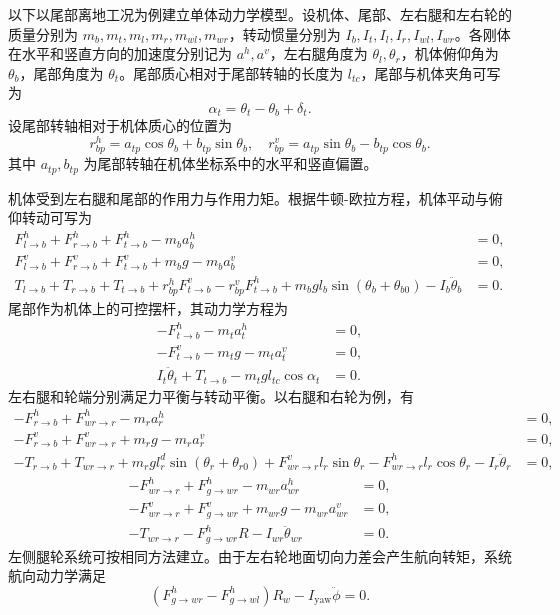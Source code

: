 \documentclass[type=bachelor]{bithesis}
\begin{document}
以下以尾部离地工况为例建立单体动力学模型。设机体、尾部、左右腿和左右轮的质量分别为 $m_b,m_t,m_l,m_r,m_{wl},m_{wr}$，转动惯量分别为 $I_b,I_t,I_l,I_r,I_{wl},I_{wr}$。各刚体在水平和竖直方向的加速度分别记为 $a^h,a^v$，左右腿角度为 $\theta_l,\theta_r$，机体俯仰角为 $\theta_b$，尾部角度为 $\theta_t$。尾部质心相对于尾部转轴的长度为 $l_{tc}$，尾部与机体夹角可写为
\begin{equation}
  \alpha_t=\theta_t-\theta_b+\delta_t .
\end{equation}
设尾部转轴相对于机体质心的位置为
\begin{equation}
  r_{bp}^h=a_{tp}\cos\theta_b+b_{tp}\sin\theta_b,\quad
  r_{bp}^v=a_{tp}\sin\theta_b-b_{tp}\cos\theta_b .
\end{equation}
其中 $a_{tp},b_{tp}$ 为尾部转轴在机体坐标系中的水平和竖直偏置。

机体受到左右腿和尾部的作用力与作用力矩。根据牛顿-欧拉方程，机体平动与俯仰转动可写为
\begin{equation}
\begin{aligned}
  F_{l\to b}^h+F_{r\to b}^h+F_{t\to b}^h-m_ba_b^h&=0,\\
  F_{l\to b}^v+F_{r\to b}^v+F_{t\to b}^v+m_bg-m_ba_b^v&=0,\\
  T_{l\to b}+T_{r\to b}+T_{t\to b}
  +r_{bp}^hF_{t\to b}^v-r_{bp}^vF_{t\to b}^h
  +m_bgl_b\sin(\theta_b+\theta_{b0})
  -I_b\ddot{\theta}_b&=0 .
\end{aligned}
\end{equation}
尾部作为机体上的可控摆杆，其动力学方程为
\begin{equation}
\begin{aligned}
  -F_{t\to b}^h-m_ta_t^h&=0,\\
  -F_{t\to b}^v-m_tg-m_ta_t^v&=0,\\
  I_t\ddot{\theta}_t+T_{t\to b}-m_tgl_{tc}\cos\alpha_t&=0 .
\end{aligned}
\end{equation}
左右腿和轮端分别满足力平衡与转动平衡。以右腿和右轮为例，有
\begin{equation}
\begin{aligned}
  -F_{r\to b}^h+F_{wr\to r}^h-m_ra_r^h&=0,\\
  -F_{r\to b}^v+F_{wr\to r}^v+m_rg-m_ra_r^v&=0,\\
  -T_{r\to b}+T_{wr\to r}
  +m_rgl_r^d\sin(\theta_r+\theta_{r0})
  +F_{wr\to r}^vl_r\sin\theta_r
  -F_{wr\to r}^hl_r\cos\theta_r
  -I_r\ddot{\theta}_r&=0,
\end{aligned}
\end{equation}
\begin{equation}
\begin{aligned}
  -F_{wr\to r}^h+F_{g\to wr}^h-m_{wr}a_{wr}^h&=0,\\
  -F_{wr\to r}^v+F_{g\to wr}^v+m_{wr}g-m_{wr}a_{wr}^v&=0,\\
  -T_{wr\to r}-F_{g\to wr}^hR-I_{wr}\ddot{\theta}_{wr}&=0 .
\end{aligned}
\end{equation}
左侧腿轮系统可按相同方法建立。由于左右轮地面切向力差会产生航向转矩，系统航向动力学满足
\begin{equation}
  (F_{g\to wr}^h-F_{g\to wl}^h)R_w-I_{\mathrm{yaw}}\ddot{\phi}=0 .
\end{equation}
\end{document}
